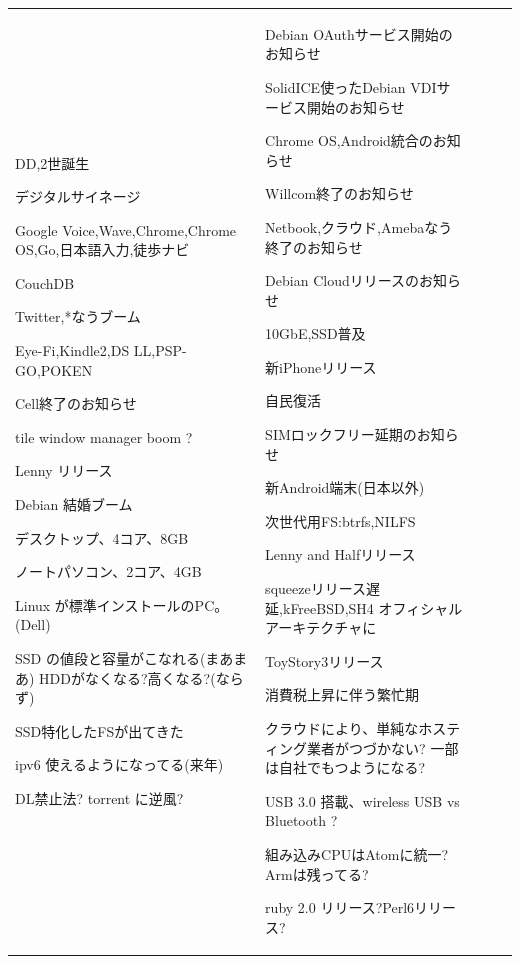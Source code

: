 \documentclass[mingoth,a4paper]{jsarticle}
\begin{document}
{\begin{tabular}[t]{|p{5em}|p{11em}|p{14em}|p{12em}|p{5em}|}
DD,2世誕生

デジタルサイネージ

Google Voice,Wave,Chrome,Chrome OS,Go,日本語入力,徒歩ナビ

CouchDB

Twitter,*なうブーム

Eye-Fi,Kindle2,DS LL,PSP-GO,POKEN

Cell終了のお知らせ

tile window manager boom ?

Lenny リリース

Debian 結婚ブーム

デスクトップ、4コア、8GB

ノートパソコン、2コア、4GB

Linux が標準インストールのPC。(Dell)

SSD の値段と容量がこなれる(まあまあ)
HDDがなくなる?高くなる?(ならず)

SSD特化したFSが出てきた

ipv6 使えるようになってる(来年)

DL禁止法? torrent に逆風?

&
Debian OAuthサービス開始のお知らせ

SolidICE使ったDebian VDIサービス開始のお知らせ

Chrome OS,Android統合のお知らせ

Willcom終了のお知らせ

Netbook,クラウド,Amebaなう終了のお知らせ

Debian Cloudリリースのお知らせ

10GbE,SSD普及

新iPhoneリリース

自民復活

SIMロックフリー延期のお知らせ

新Android端末(日本以外)

次世代用FS:btrfs,NILFS

Lenny and Halfリリース

squeezeリリース遅延,kFreeBSD,SH4 オフィシャルアーキテクチャに

ToyStory3リリース

消費税上昇に伴う繁忙期

クラウドにより、単純なホスティング業者がつづかない?
一部は自社でもつようになる?

USB 3.0 搭載、wireless USB vs Bluetooth ?

組み込みCPUはAtomに統一?Armは残ってる?

ruby 2.0 リリース?Perl6リリース?


\end{tabular}}
\end{document}
